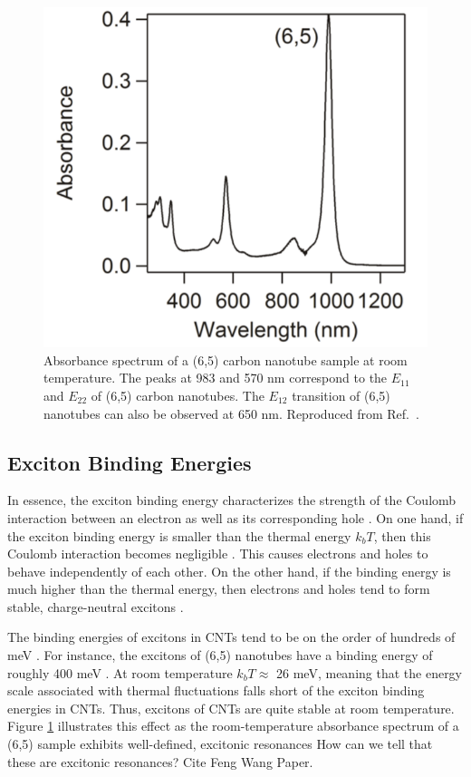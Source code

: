 \begin{figure}[ht]
	\centering
	\includegraphics[scale=0.62]{images/chapter_optical_props/cnt_absorbance_yota}
	\caption{Absorbance spectrum of a (6,5) carbon nanotube sample at room temperature. The peaks at 983 and 570 nm correspond to the $E_{11}$ and $E_{22}$ of (6,5) carbon nanotubes. The $E_{12}$ transition of (6,5) nanotubes can also be observed at 650 nm. Reproduced from Ref.\ \cite{ichinose2017extraction}. }
	\label{fig:cnt_abs_yota}
\end{figure}

\subsection{Exciton Binding Energies}

In essence, the exciton binding energy characterizes the strength of the Coulomb interaction between an electron as well as its corresponding hole \cite{valkunas2006exciton}. On one hand, if the exciton binding energy is smaller than the thermal energy $k_b T$, then this Coulomb interaction becomes negligible \cite{valkunas2006exciton}. This causes electrons and holes to behave independently of each other. On the other hand, if the binding energy is much higher than the thermal energy, then electrons and holes tend to form stable, charge-neutral excitons \cite{valkunas2006exciton}.

The binding energies of excitons in CNTs tend to be on the order of hundreds of meV \cite{wang2005optical}. For instance, the excitons of (6,5) nanotubes have a binding energy of roughly 400 meV \cite{wang2005optical}. At room temperature $k_b T \approx$ 26 meV, meaning that the energy scale associated with thermal fluctuations falls short of the exciton binding energies in CNTs. Thus, excitons of CNTs are quite stable at room temperature. Figure \ref{fig:cnt_abs_yota} illustrates this effect as the room-temperature absorbance spectrum of a (6,5) sample exhibits well-defined, excitonic resonances {\color{red} How can we tell that these are excitonic resonances? Cite Feng Wang Paper}.

